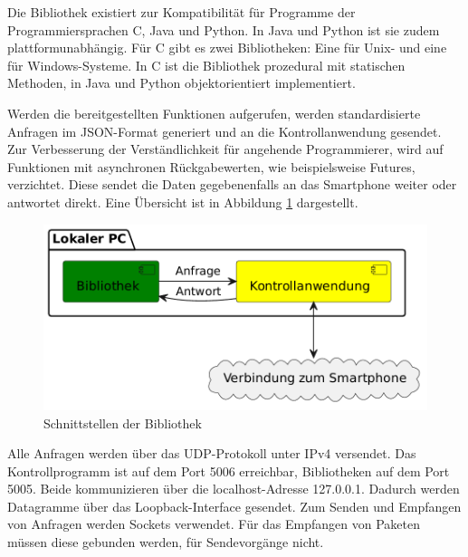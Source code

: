 \documentclass[11pt,a4paper]{report}
\begin{document}
Die Bibliothek existiert zur Kompatibilität für Programme der Programmiersprachen C, Java und Python.
In Java und Python ist sie zudem plattformunabhängig.
Für C gibt es zwei Bibliotheken: Eine für Unix- und eine für Windows-Systeme.
In C ist die Bibliothek prozedural mit statischen Methoden, in Java und Python objektorientiert implementiert.

Werden die bereitgestellten Funktionen aufgerufen, werden standardisierte Anfragen im JSON-Format generiert und an die Kontrollanwendung gesendet.
Zur Verbesserung der Verständlichkeit für angehende Programmierer, wird auf Funktionen mit asynchronen Rückgabewerten, wie beispielsweise Futures, verzichtet.
Diese sendet die Daten gegebenenfalls an das Smartphone weiter oder antwortet direkt.
Eine Übersicht ist in Abbildung \ref{fig:Schnittstelle Bibliothek} dargestellt.
\begin{figure}[htbp]
  \centering
  \includegraphics[width=.8\textwidth]{images/lib_server_connection}
  \caption{Schnittstellen der Bibliothek}
  \label{fig:Schnittstelle Bibliothek}
\end{figure}

Alle Anfragen werden über das UDP-Protokoll unter IPv4 versendet.
Das Kontrollprogramm ist auf dem Port 5006 erreichbar, Bibliotheken auf dem Port 5005.
Beide kommunizieren über die localhost-Adresse 127.0.0.1.
Dadurch werden Datagramme über das Loopback-Interface gesendet.
Zum Senden und Empfangen von Anfragen werden Sockets verwendet.
Für das Empfangen von Paketen müssen diese gebunden werden, für Sendevorgänge nicht.
\end{document}
